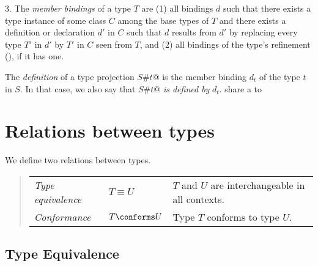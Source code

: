 3. The {\em member bindings} of a type $T$ are (1) all bindings $d$ such that
there exists a type instance of some class $C$ among the base types of $T$
and there exists a definition or declaration $d'$ in $C$
such that $d$ results from $d'$ by replacing every
type $T'$ in $d'$ by $T'$ in $C$ seen from $T$, and (2) all bindings
of the type's refinement (), if it has one.

The {\em definition} of a type projection \lstinline@$S$#$t$@ is the member
binding $d_t$ of the type $t$ in $S$. In that case, we also say
that \lstinline@$S$#$t$@ {\em is defined by} $d_t$.
share a to
\section{Relations between types}

We define two relations between types.
\begin{quote}\begin{tabular}{l@{\gap}l@{\gap}l}
\em Type equivalence & $T \equiv U$ & $T$ and $U$ are interchangeable
in all contexts.
\\
\em Conformance & $T \conforms U$ & Type $T$ conforms to type $U$.
\end{tabular}\end{quote}

\subsection{Type Equivalence}
\label{sec:type-equiv}

